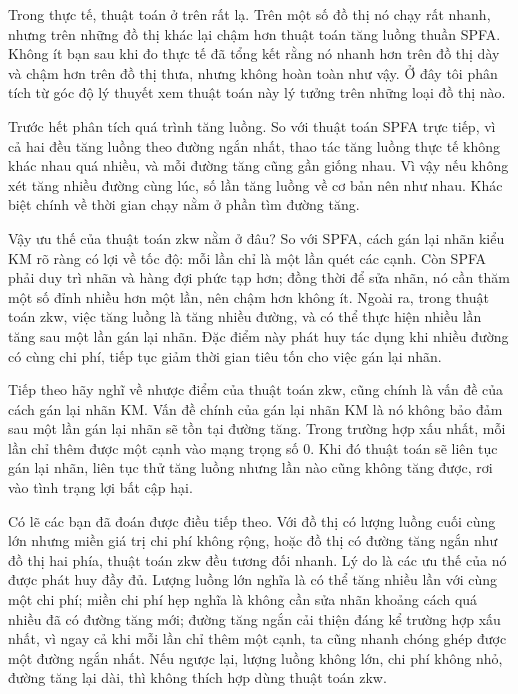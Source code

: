 \documentclass[11pt]{article}
\begin{document}
Trong thực tế, thuật toán ở trên rất lạ. Trên một số đồ thị nó chạy rất nhanh,
nhưng trên những đồ thị khác lại chậm hơn thuật toán tăng luồng thuần SPFA.
Không ít bạn sau khi đo thực tế đã tổng kết rằng nó nhanh hơn trên đồ thị dày
và chậm hơn trên đồ thị thưa, nhưng không hoàn toàn như vậy. Ở đây tôi phân
tích từ góc độ lý thuyết xem thuật toán này lý tưởng trên những loại đồ thị
nào.

Trước hết phân tích quá trình tăng luồng. So với thuật toán SPFA trực tiếp,
vì cả hai đều tăng luồng theo đường ngắn nhất, thao tác tăng luồng thực tế
không khác nhau quá nhiều, và mỗi đường tăng cũng gần giống nhau. Vì vậy nếu
không xét tăng nhiều đường cùng lúc, số lần tăng luồng về cơ bản nên như nhau.
Khác biệt chính về thời gian chạy nằm ở phần tìm đường tăng.

Vậy ưu thế của thuật toán zkw nằm ở đâu? So với SPFA, cách gán lại nhãn kiểu
KM rõ ràng có lợi về tốc độ: mỗi lần chỉ là một lần quét các cạnh. Còn SPFA
phải duy trì nhãn và hàng đợi phức tạp hơn; đồng thời để sửa nhãn, nó cần
thăm một số đỉnh nhiều hơn một lần, nên chậm hơn không ít. Ngoài ra, trong
thuật toán zkw, việc tăng luồng là tăng nhiều đường, và có thể thực hiện nhiều
lần tăng sau một lần gán lại nhãn. Đặc điểm này phát huy tác dụng khi nhiều
đường có cùng chi phí, tiếp tục giảm thời gian tiêu tốn cho việc gán lại nhãn.

Tiếp theo hãy nghĩ về nhược điểm của thuật toán zkw, cũng chính là vấn đề của
cách gán lại nhãn KM. Vấn đề chính của gán lại nhãn KM là nó không bảo đảm sau
một lần gán lại nhãn sẽ tồn tại đường tăng. Trong trường hợp xấu nhất, mỗi lần
chỉ thêm được một cạnh vào mạng trọng số $0$. Khi đó thuật toán sẽ liên tục
gán lại nhãn, liên tục thử tăng luồng nhưng lần nào cũng không tăng được, rơi
vào tình trạng lợi bất cập hại.

Có lẽ các bạn đã đoán được điều tiếp theo. Với đồ thị có lượng luồng cuối cùng
lớn nhưng miền giá trị chi phí không rộng, hoặc đồ thị có đường tăng ngắn như
đồ thị hai phía, thuật toán zkw đều tương đối nhanh. Lý do là các ưu thế của
nó được phát huy đầy đủ. Lượng luồng lớn nghĩa là có thể tăng nhiều lần với
cùng một chi phí; miền chi phí hẹp nghĩa là không cần sửa nhãn khoảng cách quá
nhiều đã có đường tăng mới; đường tăng ngắn cải thiện đáng kể trường hợp xấu
nhất, vì ngay cả khi mỗi lần chỉ thêm một cạnh, ta cũng nhanh chóng ghép được
một đường ngắn nhất. Nếu ngược lại, lượng luồng không lớn, chi phí không nhỏ,
đường tăng lại dài, thì không thích hợp dùng thuật toán zkw.
\end{document}
